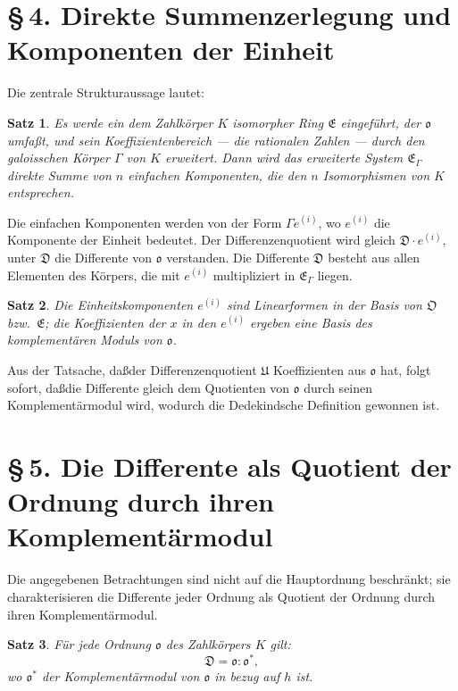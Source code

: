 \documentclass[10pt,a4paper]{article}
\theoremstyle{plain}
\newtheorem{satz}{Satz}[section]
\theoremstyle{definition}
\theoremstyle{remark}
\newcommand{\ido}{\mathfrak{o}}
\newcommand{\idD}{\mathfrak{D}}
\newcommand{\cO}{\mathfrak{O}}
\newcommand{\cE}{\mathfrak{E}}
\begin{document}
\newpage
\section*{\S\,4. Direkte Summenzerlegung und Komponenten der Einheit}

Die zentrale Strukturaussage lautet:

\begin{satz}
Es werde ein dem Zahlk\"orper $K$ isomorpher Ring $\cE$ eingef\"uhrt, der $\ido$ umfa\ss t, und sein Koeffizientenbereich --- die rationalen Zahlen --- durch den galoisschen K\"orper $\Gamma$ von $K$ erweitert. Dann wird das erweiterte System $\cE_{\Gamma}$ direkte Summe von $n$ einfachen Komponenten, die den $n$ Isomorphismen von $K$ entsprechen.
\end{satz}

Die einfachen Komponenten werden von der Form $\Gamma e^{(i)}$, wo $e^{(i)}$ die Komponente der Einheit bedeutet. Der Differenzenquotient wird gleich $\idD \cdot e^{(i)}$, unter $\idD$ die Differente von $\ido$ verstanden. Die Differente $\idD$ besteht aus allen Elementen des K\"orpers, die mit $e^{(i)}$ multipliziert in $\cE_{\Gamma}$ liegen.

\begin{satz}
Die Einheitskomponenten $e^{(i)}$ sind Linearformen in der Basis von $\cO$ bzw.\ $\cE$; die Koeffizienten der $x$ in den $e^{(i)}$ ergeben eine Basis des komplement\"aren Moduls von $\ido$.
\end{satz}

Aus der Tatsache, da\ss  der Differenzenquotient $\mathfrak{U}$ Koeffizienten aus $\ido$ hat, folgt sofort, da\ss  die Differente gleich dem Quotienten von $\ido$ durch seinen Komplement\"armodul wird, wodurch die Dedekindsche Definition gewonnen ist.

\newpage
\section*{\S\,5. Die Differente als Quotient der Ordnung durch ihren Komplement\"armodul}

Die angegebenen Betrachtungen sind nicht auf die Hauptordnung beschr\"ankt; sie charakterisieren die Differente jeder Ordnung als Quotient der Ordnung durch ihren Komplement\"armodul.

\begin{satz}
F\"ur jede Ordnung $\ido$ des Zahlk\"orpers $K$ gilt:
\[
\idD = \ido : \ido^*,
\]
wo $\ido^*$ der Komplement\"armodul von $\ido$ in bezug auf $h$ ist.
\end{satz}
\end{document}
